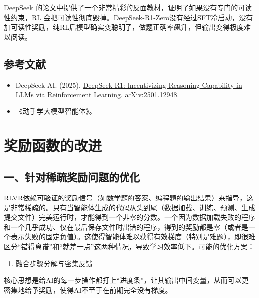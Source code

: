 DeepSeek 的论文中提供了一个非常精彩的反面教材，证明了如果没有专门的可读性约束，RL 会把可读性彻底毁掉。DeepSeek-R1-Zero没有经过SFT冷启动，没有加可读性奖励，纯RL后模型确实变聪明了，做题正确率飙升，但输出变得极度难以阅读。

\hypertarget{ux53c2ux8003ux6587ux732e-80}{%
\subsection{参考文献}\label{ux53c2ux8003ux6587ux732e-80}}

\begin{itemize}
\tightlist
\item
  DeepSeek-AI. (2025). \href{https://arxiv.org/abs/2501.12948}{DeepSeek-R1: Incentivizing Reasoning Capability in LLMs via Reinforcement Learning}. arXiv:2501.12948.
\item
  《动手学大模型智能体》。
\end{itemize}

\clearpage

\hypertarget{ux5956ux52b1ux51fdux6570ux7684ux6539ux8fdb}{%
\section{奖励函数的改进}\label{ux5956ux52b1ux51fdux6570ux7684ux6539ux8fdb}}

\hypertarget{ux4e00ux9488ux5bf9ux7a00ux758fux5956ux52b1ux95eeux9898ux7684ux4f18ux5316}{%
\subsection{一、针对稀疏奖励问题的优化}\label{ux4e00ux9488ux5bf9ux7a00ux758fux5956ux52b1ux95eeux9898ux7684ux4f18ux5316}}

RLVR依赖可验证的奖励信号（如数学题的答案、编程题的输出结果）来指导，这是非常稀疏的。只有当智能体生成的代码从头到尾（数据加载、训练、预测、生成提交文件）完美运行时，才能得到一个非零的分数。一个因为数据加载失败的程序和一个几乎成功、仅在最后保存文件时出错的程序，得到的奖励都是零（或者是一个表示失败的固定负值）。这使得智能体难以获得有效梯度（特别是难题），即很难区分``错得离谱''和``就差一点''这两种情况，导致学习效率低下。可能的优化方案：

\begin{enumerate}
\def\labelenumi{\arabic{enumi}.}
\tightlist
\item
  融合步骤分解与密集反馈
\end{enumerate}

核心思想是给AI的每一步操作都打上``进度条''，让其输出中间变量，从而可以更密集地给予奖励，使得AI不至于在前期完全没有梯度。

